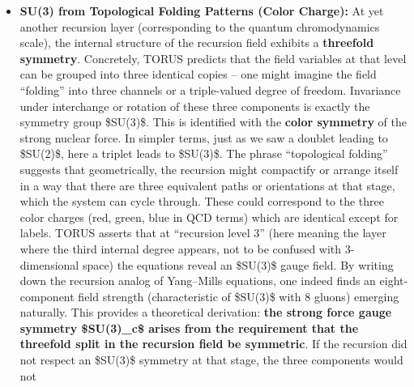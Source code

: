 \begin{itemize}
{  \$U(1)}\{\textbackslash{}text\{em\}\}\$ (electromagnetism), yielding
  three massive gauge bosons (\$W\^{}+, W\^{}-, Z\^{}0\$) and one
  massless photon, exactly as in the electroweak theory​. All of these
  details (like the values of coupling constants and the mixing angle)
  emerge from the recursion structure -- for example, the ratio of how
  the recursion fields split between the two components can determine
  the Weinberg angle of mixing​. The important takeaway is that
  \textbf{TORUS provides a group-theoretic proof that an \$SU(2)\$
  symmetry must exist given a twofold recursion degeneracy} and that
  including a phase symmetry alongside yields the electroweak gauge
  group, which then follows the pattern of symmetry breaking consistent
  with observation.
\item
  \textbf{SU(3) from Topological Folding Patterns (Color Charge):} At
  yet another recursion layer (corresponding to the quantum
  chromodynamics scale), the internal structure of the recursion field
  exhibits a \textbf{threefold symmetry}. Concretely, TORUS predicts
  that the field variables at that level can be grouped into three
  identical copies -- one might imagine the field ``folding'' into three
  channels or a triple-valued degree of freedom​. Invariance under
  interchange or rotation of these three components is exactly the
  symmetry group \$SU(3)\$. This is identified with the \textbf{color
  symmetry} of the strong nuclear force. In simpler terms, just as we
  saw a doublet leading to \$SU(2)\$, here a triplet leads to \$SU(3)\$.
  The phrase ``topological folding'' suggests that geometrically, the
  recursion might compactify or arrange itself in a way that there are
  three equivalent paths or orientations at that stage, which the system
  can cycle through. These could correspond to the three color charges
  (red, green, blue in QCD terms) which are identical except for labels.
  TORUS asserts that at ``recursion level 3'' (here meaning the layer
  where the third internal degree appears, not to be confused with
  3-dimensional space) the equations reveal an \$SU(3)\$ gauge field​.
  By writing down the recursion analog of Yang--Mills equations, one
  indeed finds an eight-component field strength (characteristic of
  \$SU(3)\$ with 8 gluons) emerging naturally​. This provides a
  theoretical derivation: \textbf{the strong force gauge symmetry
  \$SU(3)\_c\$ arises from the requirement that the threefold split in
  the recursion field be symmetric}. If the recursion did not respect an
  \$SU(3)\$ symmetry at that stage, the three components would not

\end{itemize}
